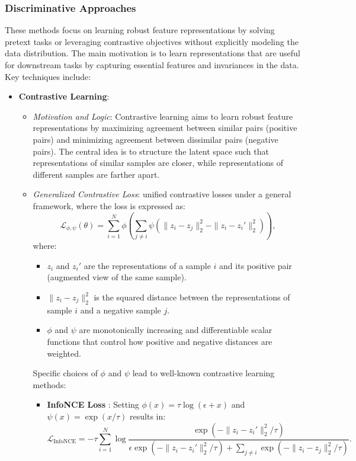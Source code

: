 \subsubsection{Discriminative Approaches}

These methods focus on learning robust feature representations by solving pretext tasks or leveraging contrastive objectives without explicitly modeling the data distribution. The main motivation is to learn representations that are useful for downstream tasks by capturing essential features and invariances in the data. Key techniques include:

\begin{itemize}
    \item \textbf{Contrastive Learning}:
    \begin{itemize}
        \item \emph{Motivation and Logic}: Contrastive learning aims to learn robust feature representations by maximizing agreement between similar pairs (positive pairs) and minimizing agreement between dissimilar pairs (negative pairs). The central idea is to structure the latent space such that representations of similar samples are closer, while representations of different samples are farther apart.

        \item \emph{Generalized Contrastive Loss}: \cite{tian2022} unified contrastive losses under a general framework, where the loss is expressed as:
        \[
        \mathcal{L}_{\phi,\psi}(\theta) = \sum_{i=1}^{N} \phi \left( \sum_{j \neq i} \psi\left(\|z_i - z_j\|_2^2 - \|z_i - z_i'\|_2^2\right) \right),
        \]
        where:
        \begin{itemize}
            \item \(z_i\) and \(z_i'\) are the representations of a sample \(i\) and its positive pair (augmented view of the same sample).
            \item \(\|z_i - z_j\|_2^2\) is the squared distance between the representations of sample \(i\) and a negative sample \(j\).
            \item \(\phi\) and \(\psi\) are monotonically increasing and differentiable scalar functions that control how positive and negative distances are weighted.
        \end{itemize}

        Specific choices of \(\phi\) and \(\psi\) lead to well-known contrastive learning methods:
        \begin{itemize}
            \item \textbf{InfoNCE Loss} \citep{oord2018representation}: Setting \(\phi(x) = \tau \log(\epsilon + x)\) and \(\psi(x) = \exp(x / \tau)\) results in:
            \[
            \mathcal{L}_{\text{InfoNCE}} = -\tau \sum_{i=1}^{N} \log \frac{\exp\left(-\|z_i - z_i'\|_2^2 / \tau\right)}{\epsilon \exp\left(-\|z_i - z_i'\|_2^2 / \tau\right) + \sum_{j \neq i} \exp\left(-\|z_i - z_j\|_2^2 / \tau\right)}.
            \]
        

\end{itemize}
\end{itemize}
\end{itemize}
